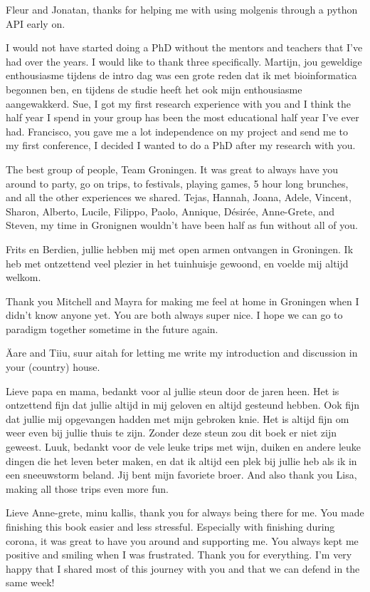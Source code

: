 \begin{appendices}
Fleur and Jonatan, thanks for helping me with using molgenis through a python API early on. 

I would not have started doing a PhD without the mentors and teachers that I've had over the years. I would like to thank three specifically. Martijn, jou geweldige enthousiasme tijdens de intro dag was een grote reden dat ik met bioinformatica begonnen ben, en tijdens de studie heeft het ook mijn enthousiasme aangewakkerd. Sue, I got my first research experience with you and I think the half year I spend in your group has been the most educational half year I've ever had. Francisco, you gave me a lot independence on my project and send me to my first conference, I decided I wanted to do a PhD after my research with you.

The best group of people, Team Groningen. It was great to always have you around to party, go on trips, to festivals, playing games, 5 hour long brunches, and all the other experiences we shared. Tejas, Hannah, Joana, Adele, Vincent, Sharon, Alberto, Lucile, Filippo, Paolo, Annique, D\'esir\'ee, Anne-Grete, and Steven, my time in Gronignen wouldn't have been half as fun without all of you. 

Frits en Berdien, jullie hebben mij met open armen ontvangen in Groningen. Ik heb met ontzettend veel plezier in het tuinhuisje gewoond, en voelde mij altijd welkom.

Thank you Mitchell and Mayra for making me feel at home in Groningen when I didn't know anyone yet. You are both always super nice. I hope we can go to paradigm together sometime in the future again.

\"Aare and Tiiu, suur aitah for letting me write my introduction and discussion in your (country) house.

Lieve papa en mama, bedankt voor al jullie steun door de jaren heen. Het is ontzettend fijn dat jullie altijd in mij geloven en altijd gesteund hebben. Ook fijn dat jullie mij opgevangen hadden met mijn gebroken knie. Het is altijd fijn om weer even bij jullie thuis te zijn. Zonder deze steun zou dit boek er niet zijn geweest. Luuk, bedankt voor de vele leuke trips met wijn, duiken en andere leuke dingen die het leven beter maken, en dat ik altijd een plek bij jullie heb als ik in een sneeuwstorm beland. Jij bent mijn favoriete broer. And also thank you Lisa, making all those trips even more fun. 

Lieve Anne-grete, minu kallis, thank you for always being there for me. You made finishing this book easier and less stressful. Especially with finishing during corona, it was great to have you around and supporting me. You always kept me positive and smiling when I was frustrated. Thank you for everything. I'm very happy that I shared most of this journey with you and that we can defend in the same week!


\end{appendices}
